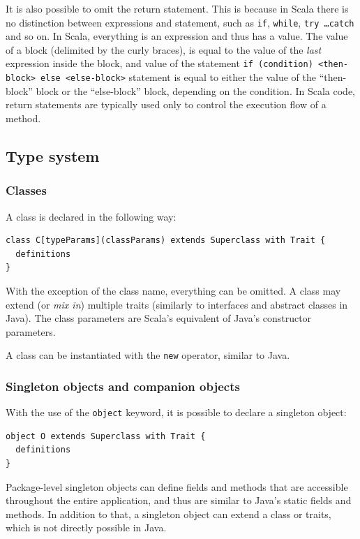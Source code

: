It is also possible to omit the return statement. This is because in Scala there is no distinction between expressions and statement, such as \texttt{if}, \texttt{while}, \texttt{try \dots catch} and so on. In Scala, everything is an expression and thus has a value. The value of a block (delimited by the curly braces), is equal to the value of the \emph{last} expression inside the block, and value of the statement \texttt{if (condition) <then-block> else <else-block>} statement is equal to either the value of the ``then-block'' block or the ``else-block'' block, depending on the condition. In Scala code, return statements are typically used only to control the execution flow of a method.

\subsection{Type system}

\subsubsection{Classes}

A class is declared in the following way:

\begin{lstlisting}
class C[typeParams](classParams) extends Superclass with Trait {
  definitions
}
\end{lstlisting}

With the exception of the class name, everything can be omitted. A class may extend (or \emph{mix in}) multiple traits (similarly to interfaces and abstract classes in Java). The class parameters are Scala's equivalent of Java's constructor parameters.

A class can be instantiated with the \texttt{new} operator, similar to Java.

\subsubsection{Singleton objects and companion objects}

With the use of the \texttt{object} keyword, it is possible to declare a singleton object:
\begin{lstlisting}
object O extends Superclass with Trait {
  definitions
}
\end{lstlisting}

Package-level singleton objects can define fields and methods that are accessible throughout the entire application, and thus are similar to Java's static fields and methods. In addition to that, a singleton object can extend a class or traits,  which is not directly possible in Java.

